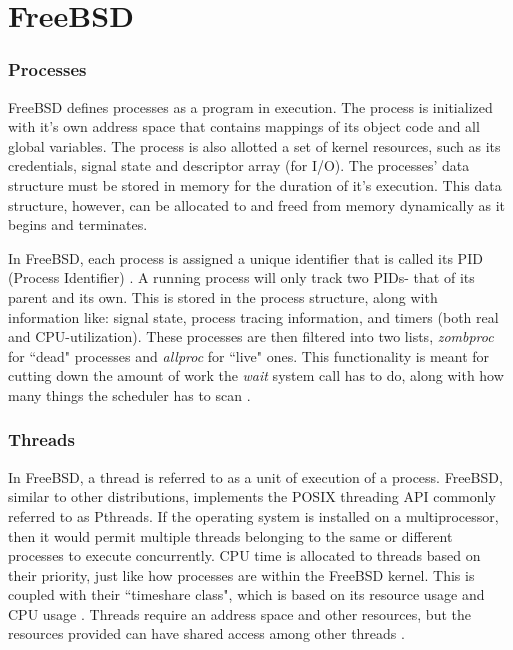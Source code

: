 \documentclass[10pt,draftclsnofoot,onecolumn]{IEEEtran}
\begin{document}
\section{FreeBSD}

\subsubsection{Processes}
\label{sub:Process FreeBSD}
\par FreeBSD defines processes as a program in execution.
The process is initialized with it's own address space that contains mappings of its object code and all global variables.
The process is also allotted a set of kernel resources, such as its credentials, signal state and descriptor array (for I/O). \cite{bsd:1}
The processes' data structure must be stored in memory for the duration of it's execution.
This data structure, however, can be allocated to and freed from memory dynamically as it begins and terminates.

\par In FreeBSD, each process is assigned a unique identifier that is called its PID (Process Identifier) \cite{bsd:1}.
A running process will only track two PIDs- that of its parent and its own.
This is stored in the process structure, along with information like: signal state, process tracing information, and timers (both real and CPU-utilization).
These processes are then filtered into two lists, \textit{zombproc} for ``dead" processes and \textit{allproc} for ``live" ones.
This functionality is meant for cutting down the amount of work the \textit{wait} system call has to do, along with how many things the scheduler has to scan \cite{bsd:1}.\\

\subsubsection{Threads}
\label{sub:Thread FreeBSD}
\par In FreeBSD, a thread is referred to as a unit of execution of a process.
FreeBSD, similar to other distributions, implements the POSIX threading API commonly referred to as Pthreads.
If the operating system is installed on a multiprocessor, then it would permit multiple threads belonging to the same or different processes to execute concurrently.
CPU time is allocated to threads based on their priority, just like how processes are within the FreeBSD kernel.
This is coupled with their ``timeshare class", which is based on its resource usage and CPU usage \cite{bsd:1}.
Threads require an address space and other resources, but the resources provided can have shared access among other threads \cite{bsd:1}.
\end{document}
